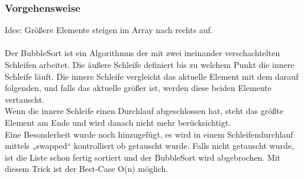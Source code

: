 \documentclass{article}
\begin{document}
\subsubsection{Vorgehensweise}
Idee: Größere Elemente steigen im Array nach rechts auf.\\ \\
Der BubbleSort ist ein Algorithmus der mit zwei ineinander verschachtelten Schleifen arbeitet. Die äußere Schleife definiert bis zu welchem Punkt die innere Schleife läuft. Die innere Schleife vergleicht das aktuelle Element mit dem darauf folgenden, und falls das aktuelle größer ist, werden diese beiden Elemente vertauscht.\\
Wenn die innere Schleife einen Durchlauf abgeschlossen hat, steht das größte Element am Ende und wird danach nicht mehr berücksichtigt. \\
Eine Besonderheit wurde noch hinzugefügt, es wird in einem Schleifendurchlauf mittels „swapped“ kontrolliert ob getauscht wurde. Falls nicht getauscht wurde, ist die Liste schon fertig sortiert und der BubbleSort wird abgebrochen. Mit diesem Trick ist der Best-Case O(n) möglich. 
\end{document}
